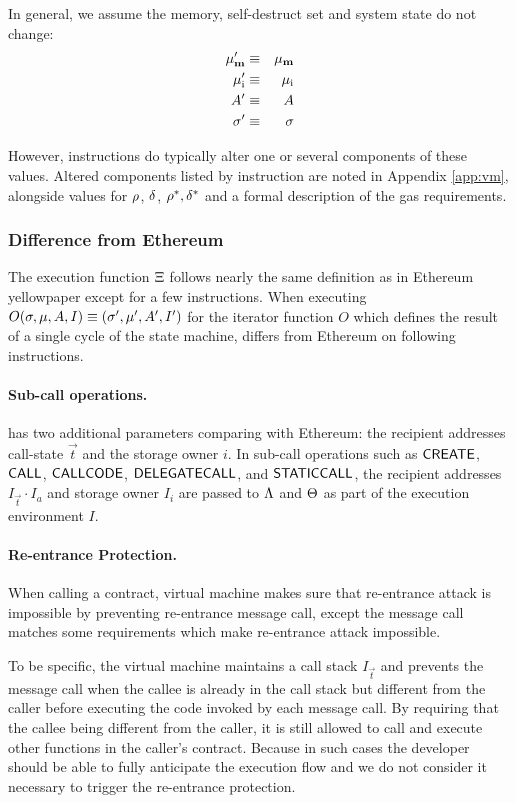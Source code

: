 In general, we assume the memory, self-destruct set and system state do not change:
\begin{eqnarray}
\mathbf{\mu}'_{\mathbf{m}} & \equiv & \mathbf{\mu}_{\mathbf{m}} \\
\mathbf{\mu}'_{\mathrm{i}} & \equiv & \mathbf{\mu}_{\mathrm{i}} \\
A' & \equiv & A \\
\mathbf{\sigma}' & \equiv & \mathbf{\sigma}
\end{eqnarray}

However, instructions do typically alter one or several components of these values. Altered components listed by instruction are noted in Appendix \ref{app:vm}, alongside values for $\mathbf{\rho}$, $\mathbf{\delta}$, $\mathbf{\rho}^*,\mathbf{\delta}^*$ and a formal description of the gas requirements.

\subsubsection{Difference from Ethereum}
The execution function $\mathrm{\Xi}$ follows nearly the same definition as in Ethereum yellowpaper \cite{ETH_yellow} except for a few instructions. 
When executing $O(\mathbf{\sigma}, \mu, A, I) \equiv (\mathbf{\sigma}' , \mu' , A' , I')$ 
for the iterator function $O$ which defines the result of a single cycle of the state machine,
{\name} differs from Ethereum on following instructions. 


\paragraph{Sub-call operations.} 
{\name} has two additional parameters comparing with Ethereum: 
the recipient addresses call-state $\vec{t}$ and the storage owner $i$.
In sub-call operations such as $\mathsf{CREATE}$, $\mathsf{CALL}$, $\mathsf{CALLCODE}$, $\mathsf{DELEGATECALL}$, and $\mathsf{STATICCALL}$,  
the recipient addresses $I_\vec{t}\cdot I_a$ and storage owner $I_i$ are passed to $\mathrm{\Lambda}$ and $\mathrm{\Theta}$ as part of the execution environment $I$. 

\paragraph{Re-entrance Protection.}

When calling a contract, {\name} virtual machine makes sure that re-entrance attack is impossible by preventing re-entrance message call, except the message call matches some requirements which make re-entrance attack impossible. 

To be specific, the {\name} virtual machine maintains a call stack $I_\vec{t}$ and 
prevents the message call
when the callee is already in the call stack but different from the caller before executing the code invoked by each message call.
By requiring that the callee being different from the caller, it is still allowed to call and execute other functions in the caller's contract.
Because in such cases the developer should be able to fully anticipate the execution flow
and we do not consider it necessary to trigger the re-entrance protection.

